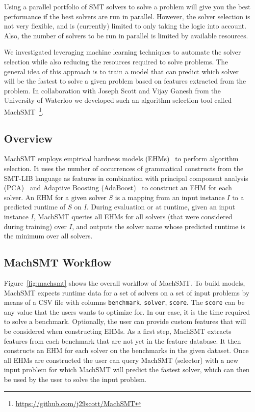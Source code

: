 \documentclass{article}
\begin{document}
Using a parallel portfolio of SMT solvers to solve a problem will give you
the best performance if the best solvers are run in parallel. However, the
solver selection is not very flexible,
and is (currently) limited to only taking the logic into account.
Also, the number of solvers to
be run in parallel is limited by available resources.

We investigated leveraging machine learning techniques to automate the
solver selection while also reducing the resources required to solve problems.
The general idea of this approach is to train a model that can predict which
solver will be the fastest to solve a given problem based on features extracted
from the problem.
In collaboration with Joseph Scott and Vijay Ganesh from the University of
Waterloo we developed such an algorithm selection tool called
MachSMT~\footnote{\url{https://github.com/j29scott/MachSMT}}.

\subsection{Overview}

MachSMT employs empirical hardness models (EHMs)~\cite{leyton2002learning}
to perform algorithm selection.
It uses the number of occurrences of grammatical constructs from the
SMT-LIB language as features in combination with principal component analysis
(PCA)~\cite{pca} and Adaptive Boosting (AdaBoost)~\cite{drucker1997improving}
to construct an EHM for each solver.
An EHM for a given solver $S$ is a mapping from an input instance $I$ to a
predicted runtime of $S$ on $I$.
During evaluation or at runtime, given an input instance $I$, MachSMT queries
all EHMs for all solvers (that were considered during training) over $I$, and
outputs the solver name whose predicted runtime is the minimum over all
solvers.

\subsection{MachSMT Workflow}

Figure~\ref{fig:machsmt} shows the overall workflow of MachSMT.
To build models, MachSMT expects runtime data for a set of solvers on a set of
input problems by means of a CSV file with columns \texttt{benchmark},
\texttt{solver}, \texttt{score}.
The \texttt{score} can be any value that the users wants to optimize for.
In our case, it is the time required to solve a benchmark.
Optionally, the user can provide custom features that will be considered when
constructing EHMs.
As a first step, MachSMT extracts features from each benchmark that are not yet
in the feature database.
It then constructs an EHM for each solver on the benchmarks in the given
dataset.
Once all EHMs are constructed the user can query MachSMT (selector) with a new
input problem for which MachSMT will predict the fastest solver, which can then
be used by the user to solve the input problem.
\end{document}
